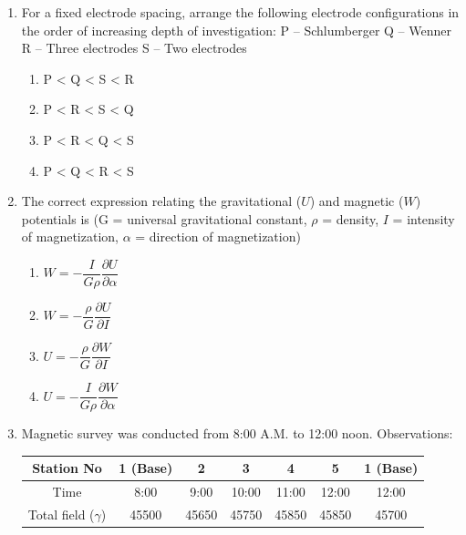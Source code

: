 \documentclass[journal,12pt,onecolumn]{IEEEtran}
\theoremstyle{remark}
\begin{document}
\begin{enumerate}[resume]
\item For a fixed electrode spacing, arrange the following electrode configurations in the order of increasing depth of investigation:  
P -- Schlumberger  
Q -- Wenner  
R -- Three electrodes  
S -- Two electrodes

\begin{multicols}{4}
\begin{enumerate}
\item P < Q < S < R  
\item P < R < S < Q  
\item P < R < Q < S  
\item P < Q < R < S  
\end{enumerate}
\end{multicols}
\vspace{0.5cm}

\item The correct expression relating the gravitational ($U$) and magnetic ($W$) potentials is  
(G = universal gravitational constant, $\rho$ = density, $I$ = intensity of magnetization, $\alpha$ = direction of magnetization)

\begin{multicols}{2}
\begin{enumerate}
\item $W = -\dfrac{I}{G\rho} \dfrac{\partial U}{\partial \alpha}$  
\item $W = -\dfrac{\rho}{G} \dfrac{\partial U}{\partial I}$  
\item $U = -\dfrac{\rho}{G} \dfrac{\partial W}{\partial I}$  
\item $U = -\dfrac{I}{G\rho} \dfrac{\partial W}{\partial \alpha}$  
\end{enumerate}
\end{multicols}
\vspace{0.5cm}

\item Magnetic survey was conducted from 8:00 A.M. to 12:00 noon. Observations:

\begin{center}
\begin{tabular}{|c|c|c|c|c|c|c|}
\hline
Station No & 1 (Base) & 2 & 3 & 4 & 5 & 1 (Base) \\
\hline
Time & 8:00 & 9:00 & 10:00 & 11:00 & 12:00 & 12:00 \\
\hline
Total field ($\gamma$) & 45500 & 45650 & 45750 & 45850 & 45850 & 45700 \\
\hline
\end{tabular}
\end{center}


\end{enumerate}
\end{document}
